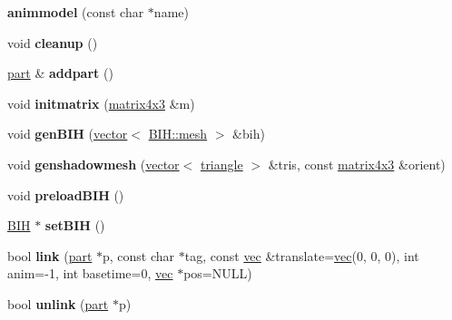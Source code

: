 \begin{DoxyCompactItemize}
{\bfseries animmodel} (const char $\ast$name)
\item 
\mbox{\label{structanimmodel_a6d8d202b0542cb7474dd042158be618d}} 
void {\bfseries cleanup} ()
\item 
\mbox{\label{structanimmodel_af2c48bdb2cbbea0aef806093a0ea07fa}} 
\hyperlink{structanimmodel_1_1part}{part} \& {\bfseries addpart} ()
\item 
\mbox{\label{structanimmodel_ac65e188f24f9a408803e7173ddc07d16}} 
void {\bfseries initmatrix} (\hyperlink{structmatrix4x3}{matrix4x3} \&m)
\item 
\mbox{\label{structanimmodel_acb1de49e303bdabbbf368f007f3d789f}} 
void {\bfseries gen\+B\+IH} (\hyperlink{structvector}{vector}$<$ \hyperlink{struct_b_i_h_1_1mesh}{B\+I\+H\+::mesh} $>$ \&bih)
\item 
\mbox{\label{structanimmodel_a92fa053090b19aae9ad1b3cdf0745357}} 
void {\bfseries genshadowmesh} (\hyperlink{structvector}{vector}$<$ \hyperlink{structtriangle}{triangle} $>$ \&tris, const \hyperlink{structmatrix4x3}{matrix4x3} \&orient)
\item 
\mbox{\label{structanimmodel_ad493436cb56e10676a3d6f236fdb0e9c}} 
void {\bfseries preload\+B\+IH} ()
\item 
\mbox{\label{structanimmodel_a1a7cb08383b1c5feefc728589561727a}} 
\hyperlink{struct_b_i_h}{B\+IH} $\ast$ {\bfseries set\+B\+IH} ()
\item 
\mbox{\label{structanimmodel_abb2471c627f61b3f1fb8ae67b116b3a5}} 
bool {\bfseries link} (\hyperlink{structanimmodel_1_1part}{part} $\ast$p, const char $\ast$tag, const \hyperlink{structvec}{vec} \&translate=\hyperlink{structvec}{vec}(0, 0, 0), int anim=-\/1, int basetime=0, \hyperlink{structvec}{vec} $\ast$pos=N\+U\+LL)
\item 
\mbox{\label{structanimmodel_a295c5ddbe03acab89bf0d887ba1474a8}} 
bool {\bfseries unlink} (\hyperlink{structanimmodel_1_1part}{part} $\ast$p)
\item 
\mbox{\label{structanimmodel_a38a471f7e4559b46b906d6aa2c8c9adc}} 

\end{DoxyCompactItemize}
